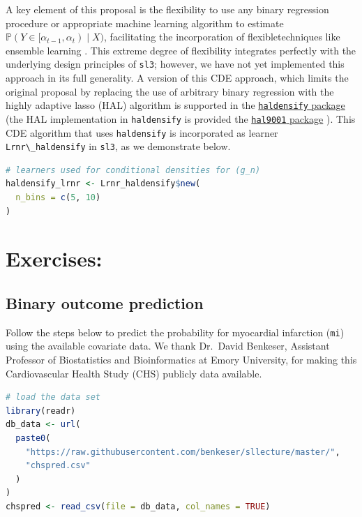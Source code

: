 \documentclass[
  12pt, krantz2,
]{krantz}
\newcommand{\passthrough}[1]{#1}
\newcommand{\1}{\mathbbm{1}}
\theoremstyle{definition}
\theoremstyle{definition}
\theoremstyle{definition}
\theoremstyle{definition}
\theoremstyle{remark}
\begin{document}
A key element of this proposal is the flexibility to use any binary regression
procedure or appropriate machine learning algorithm to estimate \(\mathbb{P}(Y \in [\alpha_{t-1}, \alpha_t) \mid X)\), facilitating the incorporation of
flexibletechniques like ensemble learning \citep{breiman1996stacked, vdl2007super}.
This extreme degree of flexibility integrates perfectly with the underlying
design principles of \passthrough{\lstinline!sl3!}; however, we have not yet implemented this approach
in its full generality. A version of this CDE approach, which limits the
original proposal by replacing the use of arbitrary binary regression with the
highly adaptive lasso (HAL) algorithm \citep{benkeser2016hal} is supported in the
\href{https://github.com/nhejazi/haldensify}{\passthrough{\lstinline!haldensify!} package}
\citep{hejazi2020haldensify} (the HAL implementation in \passthrough{\lstinline!haldensify!} is provided the
\href{https://github.com\%20tlverse/hal9001}{\passthrough{\lstinline!hal9001!} package} \citep{coyle2020hal9001, hejazi2020hal9001}). This CDE algorithm that uses \passthrough{\lstinline!haldensify!} is incorporated
as learner \passthrough{\lstinline!Lrnr\_haldensify!} in \passthrough{\lstinline!sl3!}, as we demonstrate below.

\begin{lstlisting}[language=R]
# learners used for conditional densities for (g_n)
haldensify_lrnr <- Lrnr_haldensify$new(
  n_bins = c(5, 10)
)
\end{lstlisting}

\hypertarget{exercises-1}{%
\section*{Exercises:}\label{exercises-1}}


\hypertarget{binary-outcome-prediction}{%
\subsection*{Binary outcome prediction}\label{binary-outcome-prediction}}


Follow the steps below to predict the probability for myocardial infarction
(\passthrough{\lstinline!mi!}) using the available covariate data. We thank Dr.~David Benkeser,
Assistant Professor of Biostatistics and Bioinformatics at Emory University, for
making this Cardiovascular Health Study (CHS) publicly data available.

\begin{lstlisting}[language=R]
# load the data set
library(readr)
db_data <- url(
  paste0(
    "https://raw.githubusercontent.com/benkeser/sllecture/master/",
    "chspred.csv"
  )
)
chspred <- read_csv(file = db_data, col_names = TRUE)
\end{lstlisting}
\end{document}

